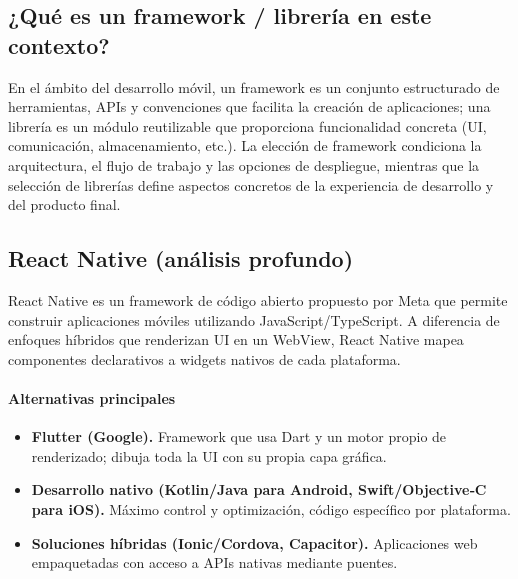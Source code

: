 \documentclass[twoside, openright, 11pt]{report}
\begin{document}
	\subsection{¿Qué es un framework / librería en este contexto?}
	En el ámbito del desarrollo móvil, un framework es un conjunto estructurado de herramientas, APIs y convenciones que facilita la creación de aplicaciones; una librería es un módulo reutilizable que proporciona funcionalidad concreta (UI, comunicación, almacenamiento, etc.). La elección de framework condiciona la arquitectura, el flujo de trabajo y las opciones de despliegue, mientras que la selección de librerías define aspectos concretos de la experiencia de desarrollo y del producto final.
	
	\subsection{React Native (análisis profundo)}
	React Native es un framework de código abierto propuesto por Meta que permite construir aplicaciones móviles utilizando JavaScript/TypeScript. A diferencia de enfoques híbridos que renderizan UI en un WebView, React Native mapea componentes declarativos a widgets nativos de cada plataforma.
	
	\paragraph{Alternativas principales}
	\begin{itemize}
		\item \textbf{Flutter (Google).} Framework que usa Dart y un motor propio de renderizado; dibuja toda la UI con su propia capa gráfica.
		\item \textbf{Desarrollo nativo (Kotlin/Java para Android, Swift/Objective‑C para iOS).} Máximo control y optimización, código específico por plataforma.
		\item \textbf{Soluciones híbridas (Ionic/Cordova, Capacitor).} Aplicaciones web empaquetadas con acceso a APIs nativas mediante puentes.
	\end{itemize}
	
\end{document}
